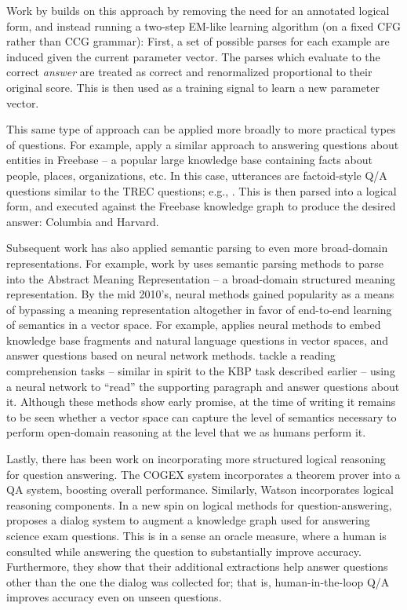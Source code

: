 Work by  builds on this approach by removing the need for
  an annotated logical form, and instead running a two-step EM-like learning algorithm
  (on a fixed CFG rather than CCG grammar):
First, a set of possible parses for each example are induced given the current parameter vector.
The parses which evaluate to the correct \textit{answer} are treated as correct and renormalized
  proportional to their original score.
This is then used as a training signal to learn a new parameter vector.

This same type of approach can be applied more broadly to more practical types of questions.
For example,  apply a similar approach to answering
  questions about entities in Freebase -- a popular large knowledge base containing facts
  about people, places, organizations, etc.
In this case, utterances are factoid-style Q/A questions similar to the TREC questions;
  e.g., .
This is then parsed into a logical form, and executed against the Freebase knowledge graph
  to produce the desired answer: Columbia and Harvard.


Subsequent work has also applied semantic parsing to even more broad-domain representations.
For example, work by  uses semantic parsing methods to parse into
  the Abstract Meaning Representation \cite{key:2013banarescu-amr} -- a 
  broad-domain structured meaning representation.
By the mid 2010's, neural methods gained popularity as a means of bypassing a meaning representation
  altogether in favor of end-to-end learning of semantics in a vector space.
For example,  applies neural methods
  to embed knowledge base fragments and natural language questions in vector spaces,
   and answer questions based on neural network methods.
 tackle a reading comprehension tasks -- similar in spirit
  to the KBP task described earlier -- using a neural network to ``read'' the supporting
  paragraph and answer questions about it.
Although these methods show early promise, at the time of writing it remains to be seen
  whether a vector space can capture the level of semantics necessary to perform
  open-domain reasoning at the level that we as humans perform it.

Lastly, there has been work on incorporating more structured logical
  reasoning for question answering.
The COGEX system \cite{key:2003moldovan-trec} incorporates a theorem
  prover into a QA system, boosting overall performance.
Similarly, Watson \cite{key:2010ferrucci-watson} incorporates
  logical reasoning components.
In a new spin on logical methods for question-answering,
   proposes
  a dialog system to augment a knowledge graph used for answering science exam
  questions.
This is in a sense an oracle measure, where a human is consulted while answering
  the question to substantially improve accuracy.
Furthermore, they show that their additional extractions help
  answer questions other than the one the dialog was collected for;
  that is, human-in-the-loop Q/A improves accuracy even on unseen questions.

